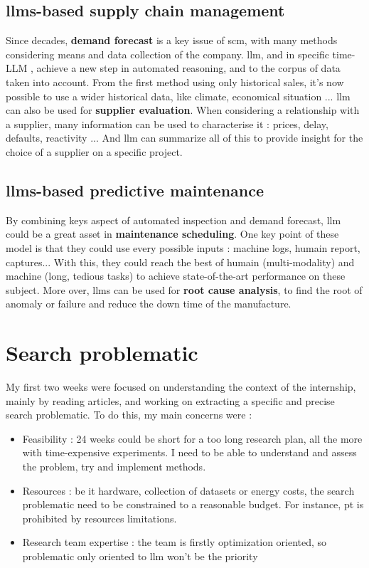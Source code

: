\subsection{\glspl{llm}-based supply chain management}
\label{sec:llm_scm}
Since decades, \textbf{demand forecast} is a key issue of \acrfull{scm}, with many methods considering means and data collection of the company. \acrshort{llm}, and in specific time-LLM \cite{jin_time-llm_2024}, achieve a new step in automated reasoning, and to the corpus of data taken into account. From the first method using only historical sales, it's now possible to use a wider historical data, like climate, economical situation ... \acrshort{llm} can also be used for \textbf{supplier evaluation}. When considering a relationship with a supplier, many information can be used to characterise it : prices, delay, defaults, reactivity ... And \acrshort{llm} can summarize all of this to provide insight for the choice of a supplier on a specific project.   


\subsection{\glspl{llm}-based predictive maintenance}
\label{sec:llm_pred_maint}
By combining keys aspect of automated inspection and demand forecast, \acrshort{llm} could be a great asset in \textbf{maintenance scheduling}. One key point of these model is that they could use every possible inputs : machine logs, humain report, captures... With this, they could reach the best of humain (multi-modality) and machine (long, tedious tasks) to achieve state-of-the-art performance on these subject. More over, \glspl{llm} can be used for \textbf{root cause analysis}, to find the root of anomaly or failure and reduce the down time of the manufacture. 

\section{Search problematic}
My first two weeks were focused on understanding the context of the internship, mainly by reading articles, and working on extracting a specific and precise search problematic. To do this, my main concerns were : 
\begin{itemize}
    \item Feasibility : 24 weeks could be short for a too long research plan, all the more with time-expensive experiments. I need to be able to understand and assess the problem, try and implement methods.
    \item Resources : be it hardware, collection of datasets or energy costs, the search problematic need to be constrained to a reasonable budget. For instance, \gls{pt} is prohibited by resources limitations.
    \item Research team expertise : the team is firstly optimization oriented, so problematic only oriented to \acrshort{llm} won't be the priority
\end{itemize}

